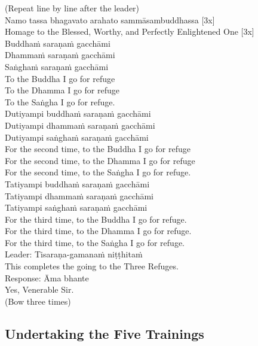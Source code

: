 (Repeat line by line after the leader)\\
Namo tassa bhagavato arahato sammāsambuddhassa [3x]\\
Homage to the Blessed, Worthy, and Perfectly Enlightened One [3x]\\
Buddhaṁ saraṇaṁ gacchāmi\\
Dhammaṁ saraṇaṁ gacchāmi\\
Saṅghaṁ saraṇaṁ gacchāmi\\
To the Buddha I go for refuge\\
To the Dhamma I go for refuge\\
To the Saṅgha I go for refuge.\\
Dutiyampi buddhaṁ saraṇaṁ gacchāmi\\
Dutiyampi dhammaṁ saraṇaṁ gacchāmi\\
Dutiyampi saṅghaṁ saraṇaṁ gacchāmi\\
For the second time, to the Buddha I go for refuge\\
For the second time, to the Dhamma I go for refuge\\
For the second time, to the Saṅgha I go for refuge.\\
Tatiyampi buddhaṁ saraṇaṁ gacchāmi\\
Tatiyampi dhammaṁ saraṇaṁ gacchāmi\\
Tatiyampi saṅghaṁ saraṇaṁ gacchāmi\\
For the third time, to the Buddha I go for refuge.\\
For the third time, to the Dhamma I go for refuge.\\
For the third time, to the Saṅgha I go for refuge.\\
Leader:         Tisaraṇa-gamanaṁ niṭṭhitaṁ\\
         This completes the going to the Three Refuges.\\
Response:     Āma bhante\\
       Yes, Venerable Sir.\\


(Bow three times)\\

\subsection{Undertaking the Five Trainings}

